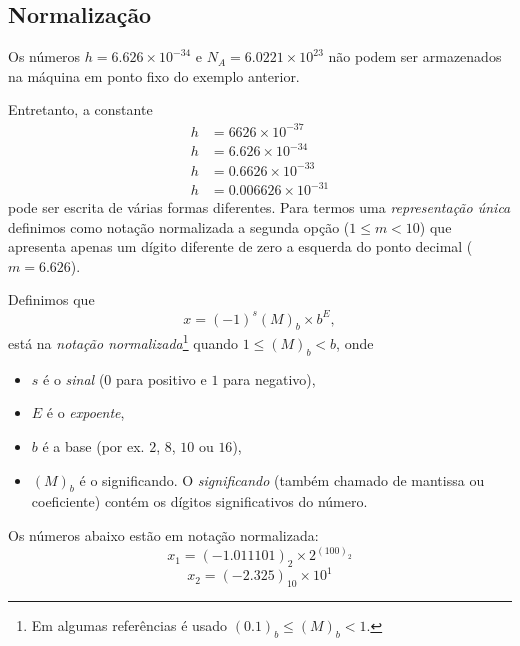 \subsection{Normalização}
Os números $h=6.626\times 10^{-34}$ e $N_A=6.0221\times 10^{23}$ não podem ser armazenados na máquina em ponto fixo do exemplo anterior.

Entretanto, a constante
\begin{equation*}
  \begin{split}
    h &=6626  \times 10^{-37} \\
    h &=6.626  \times 10^{-34} \\
    h &=0.6626 \times 10^{-33} \\
    h &=0.006626\times 10^{-31}
  \end{split}  
\end{equation*}
pode ser escrita de várias formas diferentes. Para termos uma \emph{representação única} definimos como notação normalizada a segunda opção ($1 \leq m <10$)
que apresenta apenas um dígito  diferente de zero  a esquerda do ponto decimal ($m=6.626$).

\begin{defn}
Definimos que 
 $$ x=(-1)^{s}(M)_b \times b^{E}, $$
está na \emph{notação normalizada}\footnote{Em algumas referências é usado $(0.1)_b\leq (M)_b <1$.} quando $1\leq (M)_{b}<b$, onde
\begin{itemize}
 \item $s$ é o \emph{sinal} ($0$ para positivo e $1$ para negativo),
 \item $E$ é o \emph{expoente},
 \item $b$ é a base (por ex. $2$, $8$, $10$ ou $16$),
 \item $(M)_b$ é o significando. O \emph{significando} (também chamado de mantissa ou coeficiente) contém os dígitos significativos do número.
\end{itemize}
 
\end{defn}


\begin{ex}
  Os números abaixo estão em notação normalizada:
  $$x_1=(-1.011101)_2\times 2^{(100)_2}$$
  $$x_2=(-2.325)_{10}\times  10^{1}$$
\end{ex}

